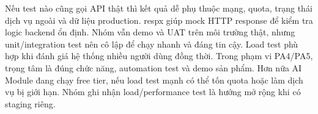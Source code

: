 {}
\markdownRendererSectionEnd \markdownRendererSectionBegin
{}\markdownRendererInterblockSeparator
{}Nếu test nào cũng gọi API thật thì kết quả dễ phụ thuộc mạng, quota, trạng thái dịch vụ ngoài và dữ liệu production.\markdownRendererParagraphSeparator
{}respx giúp mock HTTP response để kiểm tra logic backend ổn định. Nhóm vẫn demo và UAT trên môi trường thật, nhưng unit/integration test nên cô lập để chạy nhanh và đáng tin cậy.\markdownRendererInterblockSeparator
{}
\markdownRendererSectionEnd \markdownRendererSectionBegin
{}\markdownRendererInterblockSeparator
{}Load test phù hợp khi đánh giá hệ thống nhiều người dùng đồng thời. Trong phạm vi PA4/PA5, trọng tâm là đúng chức năng, automation test và demo sản phẩm.\markdownRendererParagraphSeparator
{}Hơn nữa AI Module đang chạy free tier, nếu load test mạnh có thể tốn quota hoặc làm dịch vụ bị giới hạn. Nhóm ghi nhận load/performance test là hướng mở rộng khi có staging riêng.\markdownRendererInterblockSeparator
{}\markdownRendererThematicBreak{}\markdownRendererInterblockSeparator
{}
\markdownRendererSectionEnd 
\markdownRendererSectionEnd \markdownRendererSectionBegin
{}\markdownRendererInterblockSeparator
